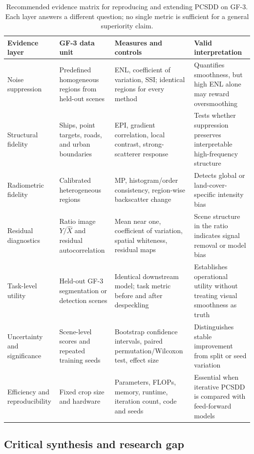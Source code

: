 \documentclass[11pt]{article}
\begin{document}
\begin{table}[t]
\centering
\caption{Recommended evidence matrix for reproducing and extending PCSDD on GF-3. Each layer answers a different question; no single metric is sufficient for a general superiority claim.}
\label{tab:evaluation}
\footnotesize
\begin{tabularx}{\textwidth}{@{}L{0.19\textwidth}L{0.22\textwidth}Y Y@{}}
\toprule
Evidence layer & GF-3 data unit & Measures and controls & Valid interpretation \\
\midrule
Noise suppression & Predefined homogeneous regions from held-out scenes & ENL, coefficient of variation, SSI; identical regions for every method & Quantifies smoothness, but high ENL alone may reward oversmoothing \\
Structural fidelity & Ships, point targets, roads, and urban boundaries & EPI, gradient correlation, local contrast, strong-scatterer response & Tests whether suppression preserves interpretable high-frequency structure \\
Radiometric fidelity & Calibrated heterogeneous regions & MP, histogram/order consistency, region-wise backscatter change & Detects global or land-cover-specific intensity bias \\
Residual diagnostics & Ratio image $Y/\widehat{X}$ and residual autocorrelation & Mean near one, coefficient of variation, spatial whiteness, residual maps & Scene structure in the ratio indicates signal removal or model bias \\
Task-level utility & Held-out GF-3 segmentation or detection scenes & Identical downstream model; task metric before and after despeckling & Establishes operational utility without treating visual smoothness as truth \\
Uncertainty and significance & Scene-level scores and repeated training seeds & Bootstrap confidence intervals, paired permutation/Wilcoxon test, effect size & Distinguishes stable improvement from split or seed variation \\
Efficiency and reproducibility & Fixed crop size and hardware & Parameters, FLOPs, memory, runtime, iteration count, code and seeds & Essential when iterative PCSDD is compared with feed-forward models \\
\bottomrule
\end{tabularx}
\end{table}

\FloatBarrier

\subsection{Critical synthesis and research gap}
\end{document}
